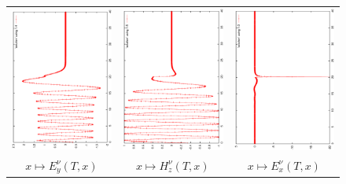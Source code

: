\begin{figure}[h]
	\begin{center}
		\begin{tabular}{ccc}
			\includegraphics[angle=-90,width=5.cm]{pics_semilagrange/Ey_moit.eps}
			&
			\includegraphics[angle=-90,width=5.cm]{pics_semilagrange/Hz_moit.eps} &
			\includegraphics[angle=-90,width=5.cm]{pics_semilagrange/Ex_moit.eps}
			\\
			$x\mapsto E_y^\nu(T,x)$ & $  x\mapsto H_z^\nu(T,x)$  & $x\mapsto E_x^\nu(T,x)$ \\

\end{tabular}
\end{center}
\end{figure}
